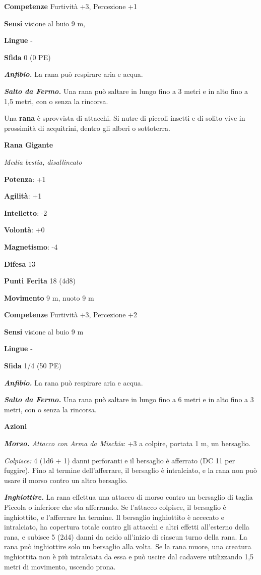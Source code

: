 \begin{multicols}{2}
\textbf{Competenze} Furtività +3, Percezione +1

\textbf{Sensi} visione al buio 9 m, 

\textbf{Lingue} -

\textbf{Sfida} 0 (0 PE)\smallskip

\emph{\textbf{Anfibio.}} La rana può respirare aria e acqua.

\emph{\textbf{Salto da Fermo.}} Una rana può saltare in lungo fino a 3
metri e in alto fino a 1,5 metri, con o senza la rincorsa.

Una \textbf{rana} è sprovvista di attacchi. Si nutre di piccoli insetti
e di solito vive in prossimità di acquitrini, dentro gli alberi o
sottoterra.

\textbf{Rana Gigante}

\emph{Media bestia, disallineato}

\textbf{Potenza}: +1

\textbf{Agilità}: +1

\textbf{Intelletto}: -2

\textbf{Volontà}: +0

\textbf{Magnetismo}: -4

\textbf{Difesa} 13

\textbf{Punti Ferita} 18 (4d8)

\textbf{Movimento} 9 m, nuoto 9 m

\textbf{Competenze} Furtività +3, Percezione +2

\textbf{Sensi} visione al buio 9 m

\textbf{Lingue} -

\textbf{Sfida} 1/4 (50 PE)\smallskip

\emph{\textbf{Anfibio.}} La rana può respirare aria e acqua.

\emph{\textbf{Salto da Fermo.}} Una rana può saltare in lungo fino a 6
metri e in alto fino a 3 metri, con o senza la rincorsa.

\smallskip\textbf{Azioni}

\emph{\textbf{Morso.} Attacco con Arma da Mischia}: +3 a colpire,
portata 1 m, un bersaglio.

\emph{Colpisce:} 4 (1d6 + 1) danni perforanti e il bersaglio è afferrato
(DC 11 per fuggire). Fino al termine dell'afferrare, il bersaglio è
intralciato, e la rana non può usare il morso contro un altro bersaglio.

\emph{\textbf{Inghiottire.}} La rana effettua una attacco di morso
contro un bersaglio di taglia Piccola o inferiore che sta afferrando. Se
l'attacco colpisce, il bersaglio è inghiottito, e l'afferrare ha
termine. Il bersaglio inghiottito è accecato e intralciato, ha copertura
totale contro gli attacchi e altri effetti all'esterno della rana, e
subisce 5 (2d4) danni da acido all'inizio di ciascun turno della rana.
La rana può inghiottire solo un bersaglio alla volta. Se la rana muore,
una creatura inghiottita non è più intralciata da essa e può uscire dal
cadavere utilizzando 1,5 metri di movimento, uscendo prona.




\end{multicols}
